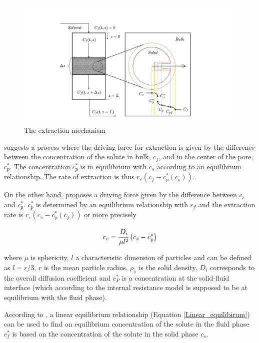 \documentclass[../Article_Model_Parameters.tex]{subfiles}
\begin{document}
		\begin{figure}[h!]
			\centering
			\includegraphics[trim = 45cm 0cm 60cm 20cm,clip,width=\columnwidth]{Figures/SFE_PFD.drawio.png}	
			\caption{The extraction mechanism}
			\label{fig: SFE_Mechanism}
		\end{figure}
			
		\citet{Bulley1984} suggests a process where the driving force for extraction is given by the difference between the concentration of the solute in bulk, $c_f$, and in the center of the pore, $c_p^*$. The concentration $c_p^*$ is in equilibrium with $c_s$ according to an equilibrium relationship. The rate of extraction is thus $r_e\left(c_f - c^*_p(c_s)\right)$.  
			
		On the other hand, \citet{Reverchon1996} proposes a driving force given by the difference between $c_s$ and $c_p^*$. $c_p^*$ is determined by an equilibrium relationship with $c_f$ and the extraction rate is $r_e\left(c_s - c^*_p(c_f)\right)$ or more precisely
			
			{\footnotesize
				\begin{equation} \label{Model_kinetic_basic}
					r_e = \cfrac{D_i}{\mu l^2 }\left(c_s - c_p^* \right)
			\end{equation} }
			
		where $\mu$ is sphericity, $l$ a characteristic dimension of particles and can be defined as $l = r/3$, $r$ is the mean particle radius, $\rho_s$ is the solid density, $D_i$ corresponds to the overall diffusion coefficient and $c_P^*$ is a concentration at the solid-fluid interface (which according to the internal resistance model is supposed to be at equilibrium with the fluid phase). 
			
		According to \citet{Bulley1984}, a linear equilibrium relationship (Equation  \ref{Linear_equilibirum}) can be used to find an equilibrium concentration of the solute in the fluid phase $c_f^*$ is based on the concentration of the solute in the solid phase $c_s$.
			
\end{document}
